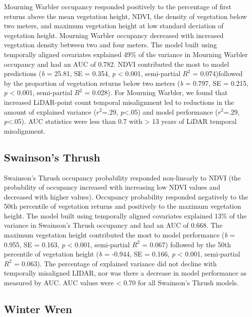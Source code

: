 \documentclass[
]{article}
\begin{document}
Mourning Warbler occupancy responded positively to the percentage of first returns above the mean vegetation height, NDVI, the density of vegetation below two meters, and maximum vegetation height at low standard deviation of vegetation height. Mourning Warbler occupancy decreased with increased vegetation density between two and four meters. The model built using temporally aligned covariates explained 49\% of the variance in Mourning Warbler occupancy and had an AUC of 0.782. NDVI contributed the most to model predictions (\emph{b} = 25.81, SE = 0.354, \emph{p} \textless{} 0.001, semi-partial \(R^2\) = 0.074)followed by the proportion of vegetation returns below two meters (\emph{b} = 0.797, SE = 0.215, \emph{p} \textless{} 0.001, semi-partial \(R^2\) = 0.028). For Mourning Warbler, we found that increased LiDAR-point count temporal misalignment led to reductions in the amount of explained variance (\(r^2\)=.29, \emph{p}\textless.05) and model performance (\(r^2\)=.29, \emph{p}\textless.05). AUC statistics were less than 0.7 with \textgreater{} 13 years of LiDAR temporal misalignment.

\hypertarget{swainsons-thrush}{%
\subsection{Swainson's Thrush}\label{swainsons-thrush}}

Swainson's Thrush occupancy probability responded non-linearly to NDVI (the probability of occupancy increased with increasing low NDVI values and decreased with higher values). Occupancy probability responded negatively to the 50th percentile of vegetation returns and positively to the maximum vegetation height. The model built using temporally aligned covariates explained 13\% of the variance in Swainson's Thrush occupancy and had an AUC of 0.668. The maximum vegetation height contributed the most to model performance (\emph{b} = 0.955, SE = 0.163, \emph{p} \textless{} 0.001, semi-partial \(R^2\) = 0.067) followed by the 50th percentile of vegetation height (\emph{b} = -0.944, SE = 0.166, \emph{p} \textless{} 0.001, semi-partial \(R^2\) = 0.063). The percentage of explained variance did not decline with temporally misaligned LIDAR, nor was there a decrease in model performance as measured by AUC. AUC values were \textless{} 0.70 for all Swainson's Thrush models.

\hypertarget{winter-wren}{%
\subsection{Winter Wren}\label{winter-wren}}
\end{document}
